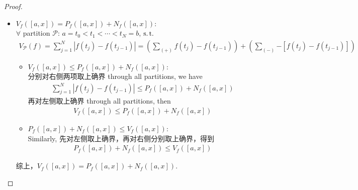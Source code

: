 \begin{lemma}
\begin{proof}
\begin{itemize}
				\newpage
				
				\item $V_{f}([a , x]) = P_{f}([a , x]) + N_{f}([a , x])$: \\
				$\forall$ partition $\mathcal{P}$: $a = t_0 < t_1 < \cdots < t_N = b$, $\operatorname{s.t.}$
				\begin{align}
					V_{\mathcal{P}}(f) 
					= \sum_{j = 1}^{N}{\left| f(t_j) - f(t_{j - 1}) \right|}
					= \left( \sum_{(+)}{f(t_j) - f(t_{j - 1})} \right) + \left( \sum_{(-)}{-\left[ f(t_j) - f(t_{j - 1}) \right]} \right)
				\end{align}
			
				\vspace{1em}
				
				\begin{itemize}
					\item $V_{f}([a , x]) \leq P_{f}([a , x]) + N_{f}([a , x])$: \\
					分别对右侧两项取上确界 through all partitions, we have
					\begin{align}
						\sum_{j = 1}^{N}{\left| f(t_j) - f(t_{j - 1}) \right|}
						\leq P_{f}([a  ,x]) + N_{f}([a , x])
					\end{align}
					再对左侧取上确界 through all partitions, then
					\begin{align}
						V_{f}([a , x]) \leq P_{f}([a , x]) + N_{f}([a , x])
					\end{align}
				
					\vspace{1em}
				
					\item $P_{f}([a , x]) + N_{f}([a , x]) \leq V_{f}([a , x])$: \\
					Similarly, 先对左侧取上确界，再对右侧分别取上确界，得到
					\begin{align}
						P_{f}([a , x]) + N_{f}([a , x]) \leq V_{f}([a , x])
					\end{align}
				\end{itemize}
			
				\vspace{1em}
			
				综上，$V_{f}([a , x]) = P_{f}([a , x]) + N_{f}([a , x])$.
			\end{itemize}
		\end{proof}
	\end{lemma}

